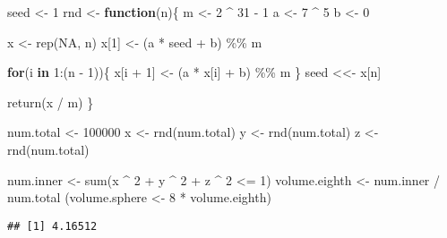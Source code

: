 \documentclass[
]{article}
\newenvironment{Shaded}{\begin{snugshade}}{\end{snugshade}}
\newcommand{\ConstantTok}[1]{\textcolor[rgb]{0.00,0.00,0.00}{#1}}
\newcommand{\ControlFlowTok}[1]{\textcolor[rgb]{0.13,0.29,0.53}{\textbf{#1}}}
\newcommand{\DecValTok}[1]{\textcolor[rgb]{0.00,0.00,0.81}{#1}}
\newcommand{\FunctionTok}[1]{\textcolor[rgb]{0.00,0.00,0.00}{#1}}
\newcommand{\NormalTok}[1]{#1}
\newcommand{\OtherTok}[1]{\textcolor[rgb]{0.56,0.35,0.01}{#1}}
\newcommand{\SpecialCharTok}[1]{\textcolor[rgb]{0.00,0.00,0.00}{#1}}
\begin{document}
\begin{Shaded}
\begin{Highlighting}[]
\NormalTok{seed }\OtherTok{\textless{}{-}} \DecValTok{1}
\NormalTok{rnd }\OtherTok{\textless{}{-}} \ControlFlowTok{function}\NormalTok{(n)\{}
\NormalTok{  m }\OtherTok{\textless{}{-}} \DecValTok{2} \SpecialCharTok{\^{}} \DecValTok{31} \SpecialCharTok{{-}} \DecValTok{1}
\NormalTok{  a }\OtherTok{\textless{}{-}} \DecValTok{7} \SpecialCharTok{\^{}} \DecValTok{5}
\NormalTok{  b }\OtherTok{\textless{}{-}} \DecValTok{0}
  
\NormalTok{  x }\OtherTok{\textless{}{-}} \FunctionTok{rep}\NormalTok{(}\ConstantTok{NA}\NormalTok{, n)}
\NormalTok{  x[}\DecValTok{1}\NormalTok{] }\OtherTok{\textless{}{-}}\NormalTok{ (a }\SpecialCharTok{*}\NormalTok{ seed }\SpecialCharTok{+}\NormalTok{ b) }\SpecialCharTok{\%\%}\NormalTok{ m}
  
  \ControlFlowTok{for}\NormalTok{(i }\ControlFlowTok{in} \DecValTok{1}\SpecialCharTok{:}\NormalTok{(n }\SpecialCharTok{{-}} \DecValTok{1}\NormalTok{))\{}
\NormalTok{    x[i }\SpecialCharTok{+} \DecValTok{1}\NormalTok{] }\OtherTok{\textless{}{-}}\NormalTok{ (a }\SpecialCharTok{*}\NormalTok{ x[i] }\SpecialCharTok{+}\NormalTok{ b) }\SpecialCharTok{\%\%}\NormalTok{ m}
\NormalTok{  \}}
\NormalTok{  seed }\OtherTok{\textless{}\textless{}{-}}\NormalTok{ x[n]}
  
  \FunctionTok{return}\NormalTok{(x }\SpecialCharTok{/}\NormalTok{ m)}
\NormalTok{\}}

\NormalTok{num.total }\OtherTok{\textless{}{-}} \DecValTok{100000}
\NormalTok{x }\OtherTok{\textless{}{-}} \FunctionTok{rnd}\NormalTok{(num.total)}
\NormalTok{y }\OtherTok{\textless{}{-}} \FunctionTok{rnd}\NormalTok{(num.total)}
\NormalTok{z }\OtherTok{\textless{}{-}} \FunctionTok{rnd}\NormalTok{(num.total)}

\NormalTok{num.inner }\OtherTok{\textless{}{-}} \FunctionTok{sum}\NormalTok{(x }\SpecialCharTok{\^{}} \DecValTok{2} \SpecialCharTok{+}\NormalTok{ y }\SpecialCharTok{\^{}} \DecValTok{2} \SpecialCharTok{+}\NormalTok{ z }\SpecialCharTok{\^{}} \DecValTok{2} \SpecialCharTok{\textless{}=} \DecValTok{1}\NormalTok{)}
\NormalTok{volume.eighth }\OtherTok{\textless{}{-}}\NormalTok{ num.inner }\SpecialCharTok{/}\NormalTok{ num.total}
\NormalTok{(volume.sphere }\OtherTok{\textless{}{-}} \DecValTok{8} \SpecialCharTok{*}\NormalTok{ volume.eighth)}
\end{Highlighting}
\end{Shaded}

\begin{verbatim}
## [1] 4.16512
\end{verbatim}
\end{document}
